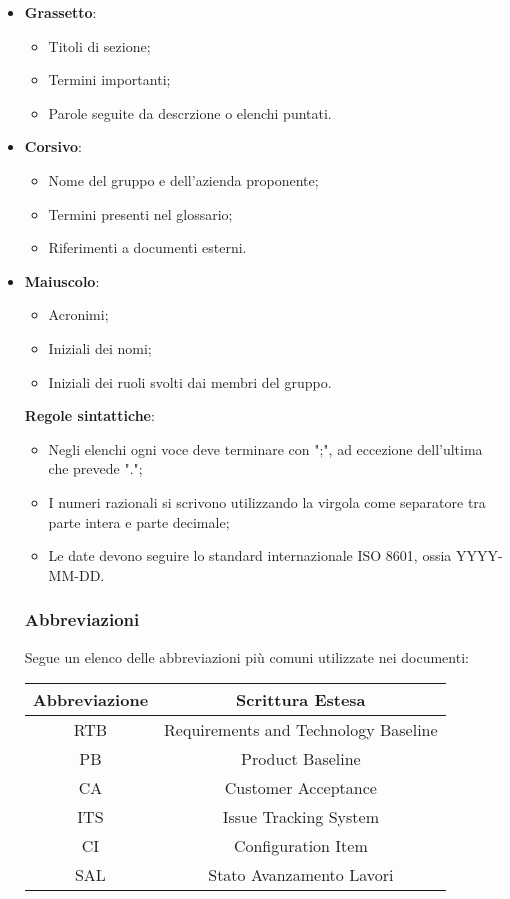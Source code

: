 \begin{itemize}
    \item \textbf{Grassetto}:
    \begin{itemize}
        \item Titoli di sezione;
        \item Termini importanti;
        \item Parole seguite da descrzione o elenchi puntati.
    \end{itemize}
    \item \textbf{Corsivo}:
    \begin{itemize}
        \item Nome del gruppo e dell'azienda proponente;
        \item Termini presenti nel glossario;
        \item Riferimenti a documenti esterni.
    \end{itemize}
    \item \textbf{Maiuscolo}:
    \begin{itemize}
        \item Acronimi;
        \item Iniziali dei nomi;
        \item Iniziali dei ruoli svolti dai membri del gruppo.
\end{itemize}
\textbf{Regole sintattiche}:
\begin{itemize}
    \item Negli elenchi ogni voce deve terminare con ";", ad eccezione dell'ultima che prevede ".";
    \item I numeri razionali si scrivono utilizzando la virgola come separatore tra parte intera e parte decimale;
    \item Le date devono seguire lo standard internazionale ISO 8601, ossia YYYY-MM-DD.
\end{itemize}

\subsubsection{Abbreviazioni}
Segue un elenco delle abbreviazioni più comuni utilizzate nei documenti:
\begin{center}
    \begin{tabular}{|c|c|}
    \hline
    \textbf{Abbreviazione} & \textbf{Scrittura Estesa} \\
    \hline
    RTB & Requirements and Technology Baseline \\
    PB & Product Baseline \\
    CA & Customer Acceptance \\
    ITS & Issue Tracking System \\
    CI & Configuration Item \\
    SAL & Stato Avanzamento Lavori \\
    \hline
    \end{tabular}
\end{center}


\end{itemize}
